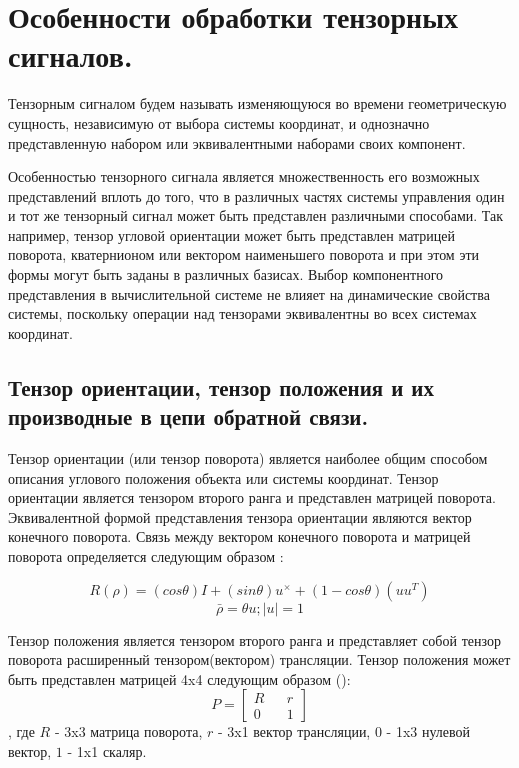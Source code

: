 \documentclass[a4paper]{article}
\begin{document}
\section{Особенности обработки тензорных сигналов.} \label{osobtens}
Тензорным сигналом будем называть изменяющуюся во времени геометрическую сущность, независимую от выбора системы координат, и однозначно представленную набором или эквивалентными наборами своих компонент. 

Особенностью тензорного сигнала является множественность его возможных представлений вплоть до того, что в различных частях системы управления один и тот же тензорный сигнал может быть представлен различными способами. Так например, тензор угловой ориентации может быть представлен матрицей поворота, кватернионом или вектором наименьшего поворота и при этом эти формы могут быть заданы в различных базисах. Выбор компонентного представления в вычислительной системе не влияет на динамические свойства системы, поскольку операции над тензорами эквивалентны во всех системах координат.

\subsection{Тензор ориентации, тензор положения и их производные в цепи обратной связи. }
Тензор ориентации (или тензор поворота) является наиболее общим способом описания углового положения объекта или системы координат. Тензор ориентации является тензором второго ранга и представлен матрицей поворота. Эквивалентной формой представления тензора ориентации являются вектор конечного поворота. Связь между вектором конечного поворота и матрицей поворота определяется следующим образом \cite{zhilin}:

\begin{equation}
R(\rho) = (cos \theta) I + (sin \theta)u^{\times} + (1-cos \theta)(uu^T)
\end{equation}
\begin{equation} \bar{\rho} = \theta u; |u| = 1 \end{equation}

Тензор положения является тензором второго ранга и представляет собой тензор поворота расширенный тензором(вектором) трансляции. Тензор положения может быть представлен матрицей 4x4 следующим образом (\cite{complex}):
\begin{equation}
P = \begin{bmatrix}R&&r\\0&&1\end{bmatrix}
\end{equation}
, где $R$ - 3x3 матрица поворота, $r$ - 3x1 вектор трансляции, $0$ - 1x3 нулевой вектор, $1$ - 1x1 скаляр.  
\end{document}
